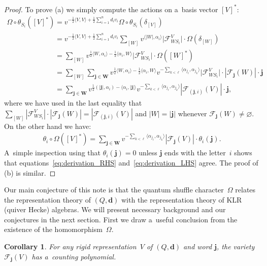 \documentclass[pdftex]{sigma}
\numberwithin{equation}{section}
\newtheorem{Corollary}[Theorem]{Corollary}
\begin{document}
\begin{proof}
To prove (a) we simply compute the actions on a~basis vector $[V]^*$:
\begin{gather}
\nonumber
\Omega\circ\theta_{S_i}([V]^*)=v^{-\frac{1}{2}\langle V,V\rangle+\frac{1}{2}\sum\limits_{i=1}^nd_iv_i}\Omega\circ\theta_{S_i}(\delta_{[V]})
\\
\phantom{\Omega\circ\theta_{S_i}([V]^*)}
\nonumber
=v^{-\frac{1}{2}\langle V,V\rangle+\frac{1}{2}\sum\limits_{i=1}^nd_iv_i}\sum\limits_{[W]}v^{\langle|W|,\alpha_i\rangle}
\big|\mathcal{F}_{WS_i}^V\big|\cdot\Omega(\delta_{[W]})
\\
\phantom{\Omega\circ\theta_{S_i}([V]^*)}
\nonumber
 =\sum\limits_{[W]}v^{\frac{1}{2}\langle
W,\alpha_i\rangle-\frac{1}{2}\langle\alpha_i,W\rangle}\big|\mathcal{F}_{WS_i}^V\big|\cdot\Omega([W]^*)
\\
\phantom{\Omega\circ\theta_{S_i}([V]^*)}
\nonumber
 =\sum\limits_{[W]}\sum\limits_{\mathbf{j}\in\mathbf{W}} v^{\frac{1}{2}\langle
W,\alpha_i\rangle-\frac{1}{2}\langle\alpha_i,W\rangle}v^{-\sum\limits_{k<\ell}\langle\alpha_{j_\ell},\alpha_{j_k}\rangle}
\big|\mathcal{F}_{WS_i}^V\big|\cdot|\mathcal{F}_\mathbf{j}(W)|\cdot\mathbf{j}
\\
\phantom{\Omega\circ\theta_{S_i}([V]^*)}
=\sum\limits_{\mathbf{j}\in\mathbf{W}} v^{\frac{1}{2}(|\mathbf{j}|,\alpha_i)-\langle
\alpha_i,|\mathbf{j}|\rangle}v^{-\sum\limits_{k<\ell}\langle\alpha_{j_\ell},\alpha_{j_k}\rangle}
|\mathcal{F}_{(\mathbf{j},i)}(V)|\cdot\mathbf{j},
\label{eq:derivation_RHS}
\end{gather}
where we have used in the last equality that
$\sum\limits_{[W]}|\mathcal{F}_{WS_i}^V|\cdot|\mathcal{F}_\mathbf{j}(W)|=|\mathcal{F}_{(\mathbf{j},i)}(V)|$ and
$|W|=|\mathbf{j}|$ whenever $\mathcal{F}_\mathbf{j}(W)\ne\varnothing$.
On the other hand we have:
\begin{gather}
\theta_i\circ\Omega([V]^*)
\label{eq:derivation_LHS}
 =\sum\limits_{\mathbf{j}\in\mathbf{W}} v^{-\sum\limits_{k<\ell}\langle\alpha_{j_\ell},\alpha_{j_k}\rangle}
|\mathcal{F}_\mathbf{j}(V)|\cdot\theta_i(\mathbf{j}).
\end{gather}
A~simple inspection using that $\theta_i(\mathbf{j})=0$ unless $\mathbf{j}$ ends with the letter~$i$ shows that
equations~\eqref{eq:derivation_RHS} and~\eqref{eq:derivation_LHS} agree.
The proof of (b) is similar.
\end{proof}

Our main conjecture of this note is that the quantum shuf\/f\/le character~$\Omega$ relates the representation theory of
$(Q,\mathbf{d})$ with the representation theory of KLR (quiver Hecke) algebras.
We will present necessary background and our conjectures in the next section.
First we draw a~useful conclusion from the existence of the homomorphism~$\Omega$.
\begin{Corollary}
\label{cor:counting polynomial}
For any rigid representation~$V$ of $(Q,\mathbf{d})$ and word $\mathbf{j}$, the variety $\mathcal{F}_\mathbf{j}(V)$ has
a~counting polynomial.
\end{Corollary}
\end{document}
